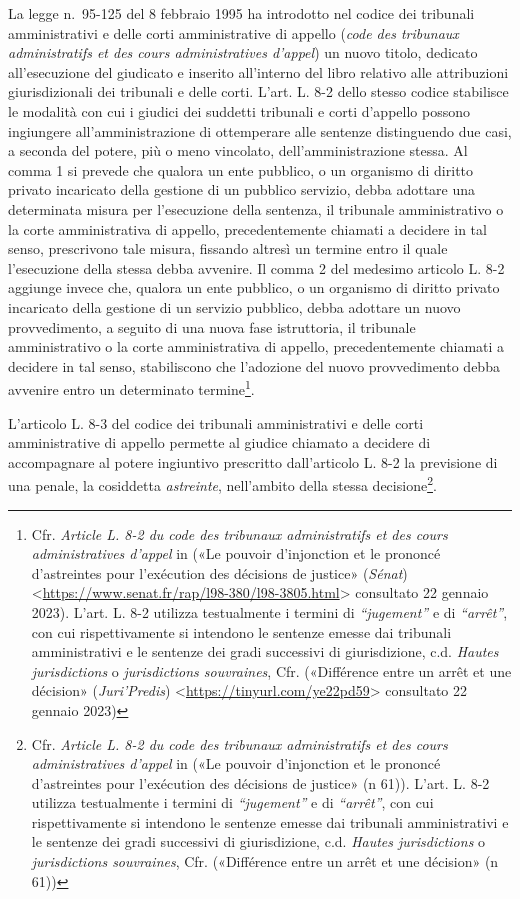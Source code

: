 \documentclass[12pt,it,a4paper,]{report}
\begin{document}
La legge n.~95-125 del 8 febbraio 1995 ha introdotto nel codice dei
tribunali amministrativi e delle corti amministrative di appello
(\emph{code des tribunaux administratifs et des cours administratives
d'appel}) un nuovo titolo, dedicato all'esecuzione del giudicato e
inserito all'interno del libro relativo alle attribuzioni
giurisdizionali dei tribunali e delle corti. L'art. L. 8-2 dello stesso
codice stabilisce le modalità con cui i giudici dei suddetti tribunali e
corti d'appello possono ingiungere all'amministrazione di ottemperare
alle sentenze distinguendo due casi, a seconda del potere, più o meno
vincolato, dell'amministrazione stessa. Al comma 1 si prevede che
qualora un ente pubblico, o un organismo di diritto privato incaricato
della gestione di un pubblico servizio, debba adottare una determinata
misura per l'esecuzione della sentenza, il tribunale amministrativo o la
corte amministrativa di appello, precedentemente chiamati a decidere in
tal senso, prescrivono tale misura, fissando altresì un termine entro il
quale l'esecuzione della stessa debba avvenire. Il comma 2 del medesimo
articolo L. 8-2 aggiunge invece che, qualora un ente pubblico, o un
organismo di diritto privato incaricato della gestione di un servizio
pubblico, debba adottare un nuovo provvedimento, a seguito di una nuova
fase istruttoria, il tribunale amministrativo o la corte amministrativa
di appello, precedentemente chiamati a decidere in tal senso,
stabiliscono che l'adozione del nuovo provvedimento debba avvenire entro
un determinato termine\footnote{Cfr. \emph{Article L. 8-2 du code des
  tribunaux administratifs et des cours administratives d'appel} in
  ({«Le pouvoir d'injonction et le prononcé d'astreintes pour
  l'exécution des décisions de justice»} (\emph{Sénat})
  \textless{}\url{https://www.senat.fr/rap/l98-380/l98-3805.html}\textgreater{}
  consultato 22 gennaio 2023). L'art. L. 8-2 utilizza testualmente i
  termini di \emph{``jugement''} e di \emph{``arrêt''}, con cui
  rispettivamente si intendono le sentenze emesse dai tribunali
  amministrativi e le sentenze dei gradi successivi di giurisdizione,
  c.d. \emph{Hautes jurisdictions} o \emph{jurisdictions souvraines},
  Cfr. ({«Différence entre un arrêt et une décision»}
  (\emph{Juri'Predis})
  \textless{}\url{https://tinyurl.com/ye22pd59}\textgreater{} consultato
  22 gennaio 2023)}.

L'articolo L. 8-3 del codice dei tribunali amministrativi e delle corti
amministrative di appello permette al giudice chiamato a decidere di
accompagnare al potere ingiuntivo prescritto dall'articolo L. 8-2 la
previsione di una penale, la cosiddetta \emph{astreinte}, nell'ambito
della stessa decisione\footnote{Cfr. \emph{Article L. 8-2 du code des
  tribunaux administratifs et des cours administratives d'appel} in
  ({«Le pouvoir d'injonction et le prononcé d'astreintes pour
  l'exécution des décisions de justice»} (n 61)). L'art. L. 8-2 utilizza
  testualmente i termini di \emph{``jugement''} e di \emph{``arrêt''},
  con cui rispettivamente si intendono le sentenze emesse dai tribunali
  amministrativi e le sentenze dei gradi successivi di giurisdizione,
  c.d. \emph{Hautes jurisdictions} o \emph{jurisdictions souvraines},
  Cfr. ({«Différence entre un arrêt et une décision»} (n 61))}.
\end{document}
